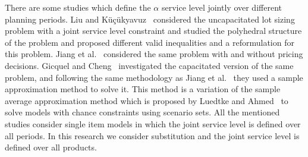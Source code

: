 \documentclass[10pt]{article}
\begin{document}
There are some studies which define the $\alpha$ service level jointly over different planning periods. Liu and K{\"u}{\c{c}}{\"u}kyavuz~\cite{liu2018polyhedral} considered the uncapacitated lot sizing problem with a joint service level constraint and studied the polyhedral structure of the problem and proposed different valid inequalities and a reformulation for this problem. Jiang et al.~\cite{jiang2017production} considered the same problem with and without pricing decisions. Gicquel and Cheng~\cite{gicquel2018joint} investigated the capacitated version of the same problem, and following the same methodology as Jiang et al.~\cite{jiang2017production} they used a sample approximation method to solve it. This method is a variation of the sample average approximation method which is proposed by Luedtke and Ahmed~\cite{luedtke2008sample} to solve models with chance constraints using scenario sets. All the mentioned studies consider single item models in which the joint service level is defined over all periods. In this research we consider substitution and the joint service level is defined over all products.
\end{document}
